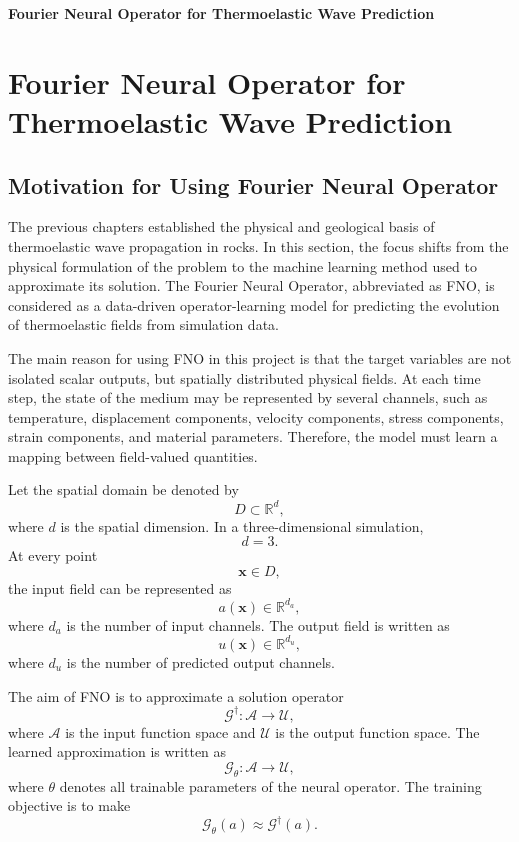 \documentclass[14pt]{extarticle}
\begin{document}
\begin{center}
    \textbf{\Large Fourier Neural Operator for Thermoelastic Wave Prediction}
\end{center}

\vspace{1cm}


\section{Fourier Neural Operator for Thermoelastic Wave Prediction}

\subsection{Motivation for Using Fourier Neural Operator}

The previous chapters established the physical and geological basis of thermoelastic wave propagation in rocks. In this section, the focus shifts from the physical formulation of the problem to the machine learning method used to approximate its solution. The Fourier Neural Operator, abbreviated as FNO, is considered as a data-driven operator-learning model for predicting the evolution of thermoelastic fields from simulation data.

The main reason for using FNO in this project is that the target variables are not isolated scalar outputs, but spatially distributed physical fields. At each time step, the state of the medium may be represented by several channels, such as temperature, displacement components, velocity components, stress components, strain components, and material parameters. Therefore, the model must learn a mapping between field-valued quantities.

Let the spatial domain be denoted by
\[
D \subset \mathbb{R}^{d},
\]
where \(d\) is the spatial dimension. In a three-dimensional simulation,
\[
d = 3.
\]
At every point
\[
\mathbf{x} \in D,
\]
the input field can be represented as
\[
a(\mathbf{x}) \in \mathbb{R}^{d_a},
\]
where \(d_a\) is the number of input channels. The output field is written as
\[
u(\mathbf{x}) \in \mathbb{R}^{d_u},
\]
where \(d_u\) is the number of predicted output channels.

The aim of FNO is to approximate a solution operator
\[
\mathcal{G}^{\dagger}: \mathcal{A} \rightarrow \mathcal{U},
\]
where \(\mathcal{A}\) is the input function space and \(\mathcal{U}\) is the output function space. The learned approximation is written as
\[
\mathcal{G}_{\theta}: \mathcal{A} \rightarrow \mathcal{U},
\]
where \(\theta\) denotes all trainable parameters of the neural operator. The training objective is to make
\[
\mathcal{G}_{\theta}(a) \approx \mathcal{G}^{\dagger}(a).
\]
\end{document}
